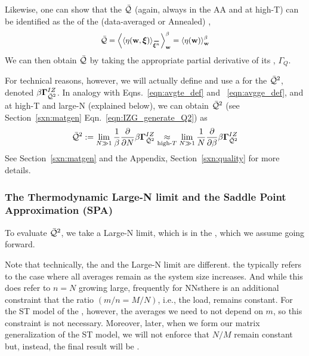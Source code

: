 {Likewise, one can show that the \Quality $\bar{\mathcal{Q}}$
(again, always in the AA and at high-T) can be identified as the \ThermalAverage of the (data-averaged or Annealed)
\SelfOverlap, 
\begin{align}
  \label{eqn:Q_def_eta}
  \Q = \THRMAVGw{\langle\ETA(\WVEC,\XI)\rangle_{\AVGNDXIn}} =\THRMAVGw{\ETA(\WVEC)}
\end{align}
We can then obtain $\bar{\mathcal{Q}}$ by taking the appropriate partial derivative of its \GeneratingFunction, $\Gamma_{Q}$.

For technical reasons, however, we will actually define and use a
\GeneratingFunction for the \AverageLayerQualitySquared $\bar{\mathcal{Q}}^{2}$, denoted $\beta\mathbf{\Gamma}^{IZ}_{\bar{\mathcal{Q}}^{2}}$.
In analogy with Eqns.~\ref{eqn:avgte_def} and ~\ref{eqn:avgge_def}, and at high-T and large-N (explained below),
we can obtain $\bar{\mathcal{Q}}^{2}$ (see Section~\ref{sxn:matgen} Eqn.~\ref{eqn:IZG_generate_Q2}) as
\begin{align}
  \label{eqn:QT_def}
  \bar{\mathcal{Q}}^{2} := \lim_{N\gg 1}\frac{1}{\beta}\frac{\partial }{\partial N}\beta\mathbf{\Gamma}^{IZ}_{\bar{\mathcal{Q}}^{2}}
  \underset{\text{high-}T}{\approx}
\lim_{N\gg 1}\frac{1}{N}\frac{\partial }{\partial \beta}\beta\mathbf{\Gamma}^{IZ}_{\bar{\mathcal{Q}}^{2}}
\end{align}
See Section~\ref{sxn:matgen} and the Appendix, Section~\ref{sxn:quality} for more details.


\subsubsection{The Thermodynamic Large-N limit and the Saddle Point Approximation (SPA)}
\label{sxn:largeN_and_SPA}
To evaluate $\bar{\mathcal{Q}}^{2}$, we take a Large-N limit, which is 
in the \ThermodynamicLimit, which we assume going forward.

Note that technically,  the \ThermodynamicLimit and the Large-N limit are different.
the \ThermodynamicLimit typically refers to the case where all \Thermodynamic averages
remain \SizeIntensive as the system size increases.
And while this does refer to $n=N$ growing large, frequently for NNsthere is an additional
constraint that the ratio $(m/n = M/N)$, i.e., the load, remains constant.\cite{SST92,MM17_TR_v1}
For the ST model of the \Perceptron, however, the \Thermodynamic averages we need to not depend on $m$,
so this constraint is not necessary.
Moreover, later, when we form our matrix generalization of the ST model, we will not
enforce that $N/M$ remain constant but, instead, the final result will be \SizeConsistent.

}
